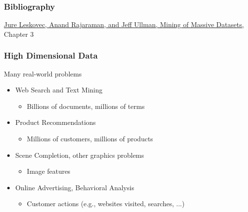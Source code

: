 \documentclass[svgnames]{beamer}
\subtitle{Efficient Similarity Search}
\begin{document}
\maketitle
\makeoutline

\begin{frame}
    \frametitle{Bibliography}
    \href{http://www.mmds.org}{Jure Leskovec, Anand Rajaraman, and Jeff Ullman, Mining of Massive Datasets,} Chapter 3
\end{frame}

\begin{frame} \frametitle{High Dimensional Data}
\begin{block}{Many real-world problems}
\begin{itemize}
\item Web Search and Text Mining
  \begin{itemize}
  \item Billions of documents, millions of terms
  \end{itemize}
\item Product Recommendations
  \begin{itemize}
  \item Millions of customers, millions of products
  \end{itemize}
\item Scene Completion, other graphics problems
  \begin{itemize}
  \item Image features
  \end{itemize}
\item Online Advertising, Behavioral Analysis
  \begin{itemize}
  \item Customer actions (e.g., websites visited, searches, ...)
  \end{itemize}
\end{itemize}
\end{block}
\end{frame}

  
\end{document}
